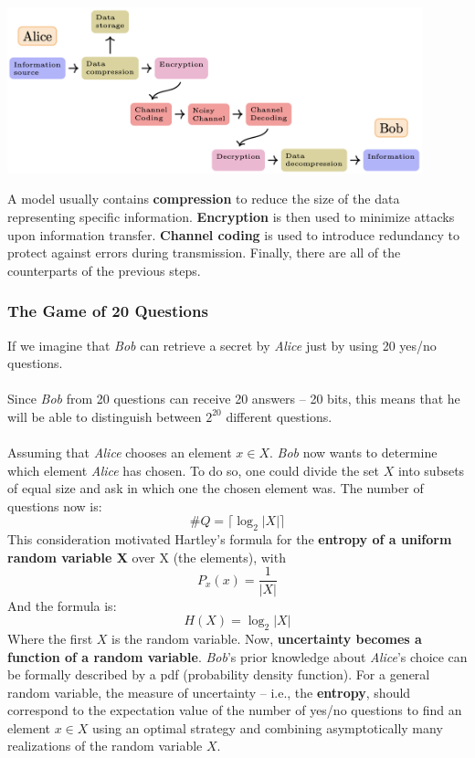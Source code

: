 \documentclass{article}
\begin{document}
\begin{center}
	\includegraphics[width=12cm]{assets/information_theory.png}
\end{center}
A model usually contains \textbf{compression} to reduce the size of the data representing specific information. \textbf{Encryption} is then used to minimize attacks upon information transfer. \textbf{Channel coding} is used to introduce redundancy to protect against errors during transmission. Finally, there are all of the counterparts of the previous steps.

\subsubsection{The Game of 20 Questions}
If we imagine that \textit{Bob} can retrieve a secret by \textit{Alice} just by using 20 yes/no questions. \\ \\
Since \textit{Bob} from 20 questions can receive 20 answers -- 20 bits, this means that he will be able to distinguish between $2^20$ different questions. \\ \\
Assuming that \textit{Alice} chooses an element $x \in X$. \textit{Bob} now wants to determine which element \textit{Alice} has chosen. To do so, one could divide the set $X$ into subsets of equal size and ask in which one the chosen element was. The number of questions now is:
\[ \#Q = \lceil \log_2 |X|\rceil \]
This consideration motivated Hartley's formula for the \textbf{entropy of a uniform random variable X} over X (the elements), with
\[ P_x(x) = \frac{1}{|X|} \]
And the formula is:
\[ H(X) = \log_2|X| \]
Where the first $X$ is the random variable. Now, \textbf{uncertainty becomes a function of a random variable}. \textit{Bob}'s prior knowledge about \textit{Alice}'s choice can be formally described by a pdf (probability density function). For a general random variable, the measure of uncertainty -- i.e., the \textbf{entropy}, should correspond to the expectation value of the number of yes/no questions to find an element $x \in X$ using an optimal strategy and combining asymptotically many realizations of the random variable $X$.
\end{document}
